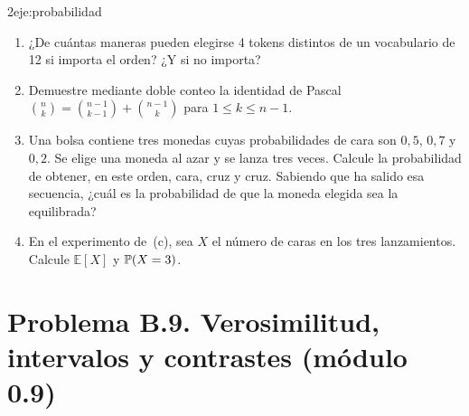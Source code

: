 \begin{ejercicio}{2}{eje:probabilidad}
\begin{enumerate}[label=(\alph*)]
  \item {} ¿De cuántas maneras pueden elegirse 4 tokens distintos de un vocabulario de 12 si importa el orden? ¿Y si no importa?
  \item {} Demuestre mediante doble conteo la identidad de Pascal $\binom{n}{k}=\binom{n-1}{k-1}+\binom{n-1}{k}$ para $1\le k\le n-1$.
  \item {} Una bolsa contiene tres monedas cuyas probabilidades de cara son $0{,}5$, $0{,}7$ y $0{,}2$. Se elige una moneda al azar y se lanza tres veces. Calcule la probabilidad de obtener, en este orden, cara, cruz y cruz. Sabiendo que ha salido esa secuencia, ¿cuál es la probabilidad de que la moneda elegida sea la equilibrada?
  \item {} En el experimento de~(c), sea $X$ el número de caras en los tres lanzamientos. Calcule $\mathbb E[X]$ y $\mathbb{P}(X=3)$.
\end{enumerate}
\end{ejercicio}

\section*{Problema B.9. Verosimilitud, intervalos y contrastes (módulo 0.9)}

